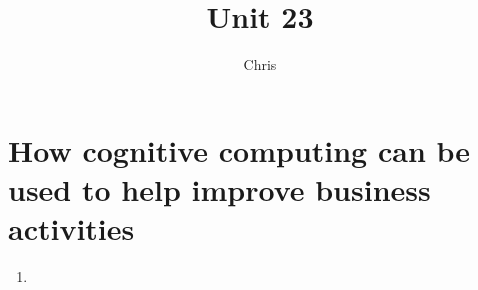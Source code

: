 \documentclass{article}
\title{Unit 23}
\author{Chris}
\date{}
\begin{document}
\section{How cognitive computing can be used to help improve business activities}

\begin{enumerate}
    \item 
\end{enumerate}
\end{document}
